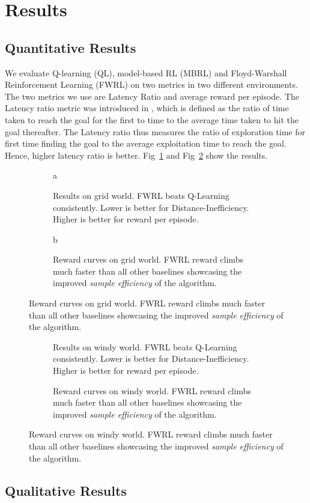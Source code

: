 \section{Results}

\subsection{Quantitative Results}
We evaluate Q-learning (QL), model-based RL (MBRL) and Floyd-Warshall
Reinforcement Learning (FWRL) on two metrics in two different environments. The
two metrics we use are Latency Ratio and average reward per episode. The Latency
ratio metric was introduced in \citet{MiPaViICLR2017}, which is defined as the
ratio of time taken to reach the goal for the first to time to the average time
taken to hit the goal thereafter. The Latency ratio thus measures the ratio of
exploration time for first time finding the goal to the average exploitation
time to reach the goal. Hence, higher latency ratio is better.
Fig~\ref{fig:ql-fw-grid-world-results} and
Fig~\ref{fig:ql-fw-windy-world-results} show the results.

\begin{figure}%
    \begin{subfigure}
        \texttt{[image: ./media/metrics-grid-world.pdf]}{a}
        \caption{Results on grid world. FWRL beats Q-Learning
        consistently. Lower is better for Distance-Inefficiency. Higher
        is better for reward per episode. }
    \end{subfigure}
    \begin{subfigure}
        \texttt{[image: ./media/rewards-metrics-grid-world.pdf]}{b}
        \caption{Reward curves on grid world. FWRL reward climbs much
        faster than all other baselines showcasing the improved \emph{sample
        efficiency} of the algorithm.}
    \end{subfigure}
    \label{fig:ql-fw-grid-world-results}%
\end{figure}


\begin{figure}
    \begin{subfigure}
        \texttt{[image: ./media/metrics-windy-world.pdf]}
        \caption{Results on windy world. FWRL beats Q-Learning
        consistently. Lower is better for Distance-Inefficiency. Higher
        is better for reward per episode. }
    \end{subfigure}
    \begin{subfigure}
        \texttt{[image: ./media/rewards-metrics-windy-world.pdf]}
        \caption{Reward curves on windy world. FWRL reward climbs much
        faster than all other baselines showcasing the improved \emph{sample
        efficiency} of the algorithm.}
    \end{subfigure}
    \label{fig:ql-fw-windy-world-results}%
\end{figure}


\subsection{Qualitative Results}
